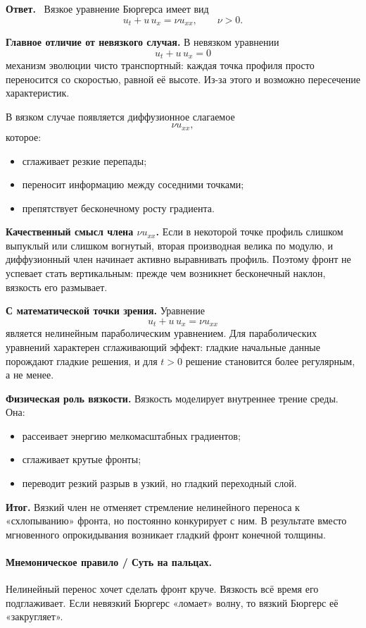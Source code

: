 \documentclass[a4paper,12pt]{article}
\newcommand{\Answer}{\textbf{Ответ.}\ }
\begin{document}
\Answer
Вязкое уравнение Бюргерса имеет вид
\[
u_t+u\,u_x=\nu u_{xx},
\qquad \nu>0.
\]

\textbf{Главное отличие от невязкого случая.}
В невязком уравнении
\[
u_t+u\,u_x=0
\]
механизм эволюции чисто транспортный: каждая точка профиля просто переносится со скоростью, равной её высоте. Из-за этого и возможно пересечение характеристик.

В вязком случае появляется диффузионное слагаемое
\[
\nu u_{xx},
\]
которое:
\begin{itemize}
  \item сглаживает резкие перепады;
  \item переносит информацию между соседними точками;
  \item препятствует бесконечному росту градиента.
\end{itemize}

\textbf{Качественный смысл члена $\nu u_{xx}$.}
Если в некоторой точке профиль слишком выпуклый или слишком вогнутый, вторая производная велика по модулю, и диффузионный член начинает активно выравнивать профиль. Поэтому фронт не успевает стать вертикальным: прежде чем возникнет бесконечный наклон, вязкость его размывает.

\textbf{С математической точки зрения.}
Уравнение
\[
u_t+u\,u_x=\nu u_{xx}
\]
является нелинейным параболическим уравнением. Для параболических уравнений характерен сглаживающий эффект: гладкие начальные данные порождают гладкие решения, и для $t>0$ решение становится более регулярным, а не менее.

\textbf{Физическая роль вязкости.}
Вязкость моделирует внутреннее трение среды. Она:
\begin{itemize}
  \item рассеивает энергию мелкомасштабных градиентов;
  \item сглаживает крутые фронты;
  \item переводит резкий разрыв в узкий, но гладкий переходный слой.
\end{itemize}

\textbf{Итог.}
Вязкий член не отменяет стремление нелинейного переноса к «схлопыванию» фронта, но постоянно конкурирует с ним. В результате вместо мгновенного опрокидывания возникает гладкий фронт конечной толщины.

\paragraph{Мнемоническое правило / Суть на пальцах.}
Нелинейный перенос хочет сделать фронт круче. Вязкость всё время его подглаживает. Если невязкий Бюргерс «ломает» волну, то вязкий Бюргерс её «закругляет».
\end{document}
